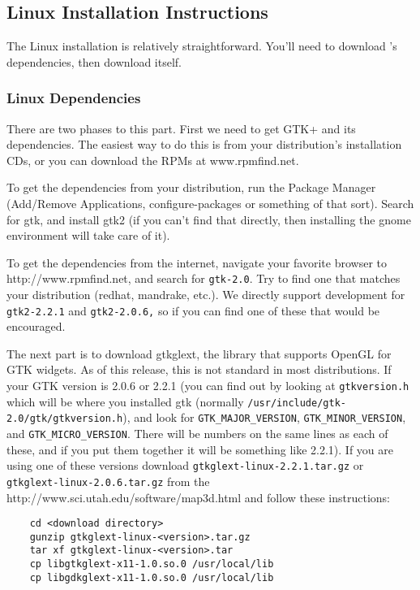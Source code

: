 \subsection{Linux Installation Instructions}
\label{sec:linux-install}

The Linux installation is relatively straightforward.  You'll need to 
download \map{}'s dependencies, then download \map{} itself.

\subsubsection{Linux Dependencies}

There are two phases to this part.  First we need to get GTK+ and its
dependencies.  The easiest way to do this is from your distribution's 
installation CDs, or you can download the RPMs at www.rpmfind.net.  

To get the dependencies from your distribution, run the Package Manager
(Add/Remove Applications, configure-packages or something of that sort).
Search for gtk, and install gtk2 (if you can't find that directly, then 
installing the gnome environment will take care of it).

To get the dependencies from the internet, navigate your favorite browser
to  {http://www.rpmfind.net}, and
search for \texttt{gtk-2.0}.  Try to find one that matches your
distribution (redhat, mandrake, etc.). We directly support development for
\texttt{gtk2-2.2.1} and \texttt{gtk2-2.0.6,} so if you can find one of
these that would be encouraged.

The next part is to download gtkglext, the library that supports OpenGL for
GTK widgets.  As of this release, this is not standard in most
distributions.  If your GTK version is 2.0.6 or 2.2.1 (you can find out by
looking at \texttt{gtkversion.h} which will be where you installed gtk
(normally \texttt{/usr/include/gtk-2.0/gtk/gtkversion.h}), and look for
\verb|GTK_MAJOR_VERSION|, \verb|GTK_MINOR_VERSION|, and
\verb|GTK_MICRO_VERSION|.  There will be numbers on the same lines as each
of these, and if you put them together it will be something like 2.2.1).
If you are using one of these versions download
\texttt{gtkglext-linux-2.2.1.tar.gz} or \texttt{gtkglext-linux-2.0.6.tar.gz} from
the \map{} 
{http://www.sci.utah.edu/software/map3d.html} and follow these
instructions:
%
\begin{verbatim}
    cd <download directory>
    gunzip gtkglext-linux-<version>.tar.gz
    tar xf gtkglext-linux-<version>.tar
    cp libgtkglext-x11-1.0.so.0 /usr/local/lib
    cp libgdkglext-x11-1.0.so.0 /usr/local/lib
\end{verbatim}

